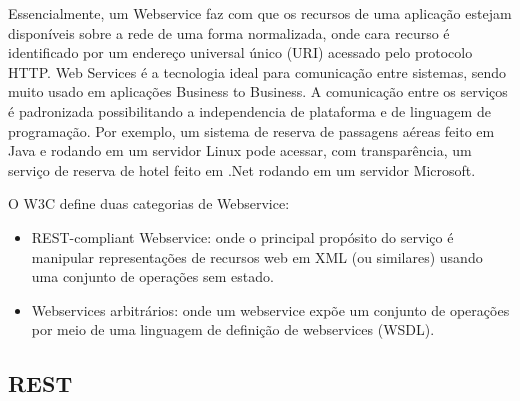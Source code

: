 Essencialmente, um Webservice faz com que os recursos de uma aplicação estejam disponíveis sobre a rede de uma forma normalizada, onde cara recurso é identificado por um endereço universal único (URI) acessado pelo protocolo HTTP. Web Services é a tecnologia ideal para comunicação entre sistemas, sendo muito usado em aplicações Business to Business. A comunicação entre os serviços é padronizada possibilitando a independencia de plataforma e de linguagem de programação. Por exemplo, um sistema de reserva de passagens aéreas feito em Java e rodando em um servidor Linux pode acessar, com transparência, um serviço de reserva de hotel feito em .Net rodando em um servidor Microsoft.

O W3C define duas categorias de Webservice:

\begin{itemize}
	\item REST-compliant Webservice: onde o principal propósito do serviço é manipular representações de recursos web em XML (ou similares) usando uma conjunto de operações sem estado.
		\item Webservices arbitrários: onde um webservice expõe um conjunto de operações por meio de uma linguagem de definição de webservices (WSDL).
\end{itemize}

\subsection{REST}
